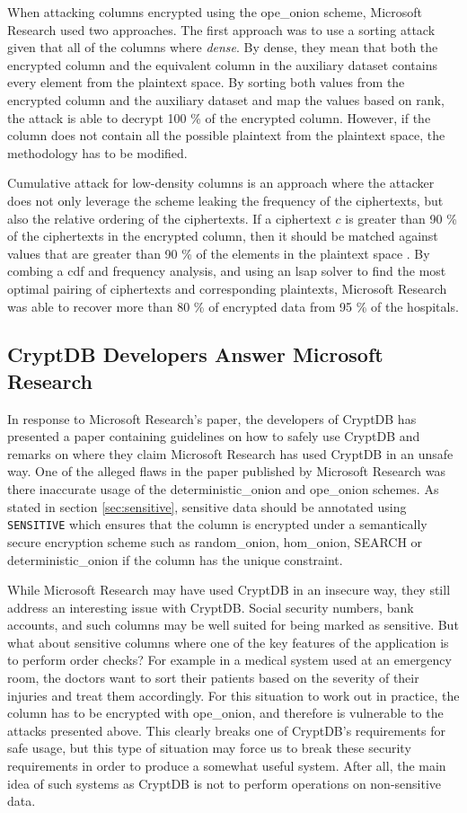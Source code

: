 When attacking columns encrypted using the \gls{ope_onion} scheme, Microsoft Research used two approaches. The first approach was to use a sorting attack given that all of the columns where \emph{dense}. By dense, they mean that both the encrypted column and the equivalent column in the auxiliary dataset contains every element from the plaintext space. By sorting both values from the encrypted column and the auxiliary dataset and map the values based on rank, the attack is able to decrypt 100 \% of the encrypted column. However, if the column does not contain all the possible plaintext from the plaintext space, the methodology has to be modified.

Cumulative attack for low-density columns is an approach where the attacker does not only leverage the scheme leaking the frequency of the ciphertexts, but also the relative ordering of the ciphertexts. If a ciphertext $c$ is greater than 90 \% of the ciphertexts in the encrypted column, then it should be matched against values that are greater than 90 \% of the elements in the plaintext space \cite{microsoft_cryptdb}. By combing a \gls{cdf} and frequency analysis, and using an \gls{lsap} solver to find the most optimal pairing of ciphertexts and corresponding plaintexts, Microsoft Research was able to recover more than 80 \% of encrypted data from 95 \% of the hospitals.

\subsection{CryptDB Developers Answer Microsoft Research}

In response to Microsoft Research's paper, the developers of CryptDB has presented a paper containing guidelines \cite{cryptdb_guidelines} on how to safely use CryptDB and remarks on where they claim Microsoft Research has used CryptDB in an unsafe way. One of the alleged flaws in the paper published by Microsoft Research was there inaccurate usage of the \gls{deterministic_onion} and \gls{ope_onion} schemes. As stated in section \ref{sec:sensitive}, sensitive data should be annotated using \verb!SENSITIVE! which ensures that the column is encrypted under a semantically secure encryption scheme such as \gls{random_onion}, \gls{hom_onion}, SEARCH or \gls{deterministic_onion} if the column has the unique constraint. 

While Microsoft Research may have used CryptDB in an insecure way, they still address an interesting issue with CryptDB. Social security numbers, bank accounts, and such columns may be well suited for being marked as sensitive. But what about sensitive columns where one of the key features of the application is to perform order checks? For example in a medical system used at an emergency room, the doctors want to sort their patients based on the severity of their injuries and treat them accordingly. For this situation to work out in practice, the column has to be encrypted with \gls{ope_onion}, and therefore is vulnerable to the attacks presented above. This clearly breaks one of CryptDB's requirements for safe usage, but this type of situation may force us to break these security requirements in order to produce a somewhat useful system. After all, the main idea of such systems as CryptDB is not to perform operations on non-sensitive data.